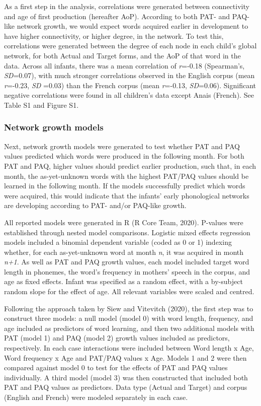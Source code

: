 \documentclass[
  english,
  man,floatsintext]{apa6}
\begin{document}
As a first step in the analysis, correlations were generated between connectivity and age of first production (hereafter AoP). According to both PAT- and PAQ-like network growth, we would expect words acquired earlier in development to have higher connectivity, or higher degree, in the network. To test this, correlations were generated between the degree of each node in each child's global network, for both Actual and Target forms, and the AoP of that word in the data. Across all infants, there was a mean correlation of \emph{r}=-0.18 (Spearman's, \emph{SD}=0.07), with much stronger correlations observed in the English corpus (mean \emph{r}=-0.23, \emph{SD} =0.03) than the French corpus (mean \emph{r}=-0.13, \emph{SD}=0.06). Significant negative correlations were found in all children's data except Anais (French). See Table S1 and Figure S1.

\hypertarget{network-growth-models-1}{%
\subsubsection{Network growth models}\label{network-growth-models-1}}

Next, network growth models were generated to test whether PAT and PAQ values predicted which words were produced in the following month. For both PAT and PAQ, higher values should predict earlier production, such that, in each month, the as-yet-unknown words with the highest PAT/PAQ values should be learned in the following month. If the models successfully predict which words were acquired, this would indicate that the infants' early phonological networks are developing according to PAT- and/or PAQ-like growth.

All reported models were generated in R (R Core Team, 2020). P-values were established through nested model comparisons. Logistic mixed effects regression models included a binomial dependent variable (coded as 0 or 1) indexing whether, for each as-yet-unknown word at month \emph{n}, it was acquired in month \emph{n+1}. As well as PAT and PAQ growth values, each model included target word length in phonemes, the word's frequency in mothers' speech in the corpus, and age as fixed effects. Infant was specified as a random effect, with a by-subject random slope for the effect of age. All relevant variables were scaled and centred.

Following the approach taken by Siew and Vitevitch (2020), the first step was to construct three models: a null model (model 0) with word length, frequency, and age included as predictors of word learning, and then two additional models with PAT (model 1) and PAQ (model 2) growth values included as predictors, respectively. In each case interactions were included between Word length x Age, Word frequency x Age and PAT/PAQ values x Age. Models 1 and 2 were then compared against model 0 to test for the effects of PAT and PAQ values individually. A third model (model 3) was then constructed that included both PAT and PAQ values as predictors. Data type (Actual and Target) and corpus (English and French) were modeled separately in each case.
\end{document}
